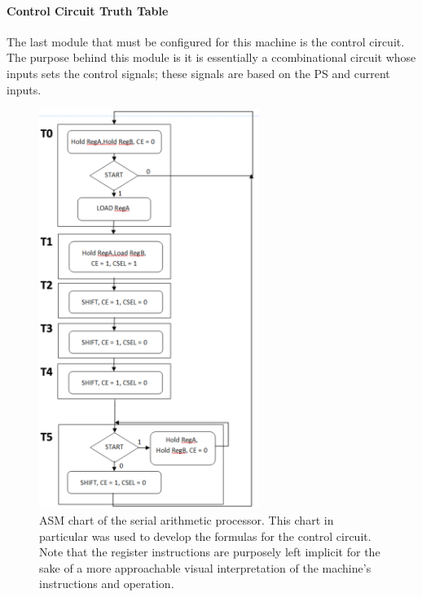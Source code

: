 \documentclass[11pt,a4paper,english]{article}
\begin{document}
   \paragraph*{Control Circuit Truth Table}
   The last module that must be configured for this machine is the control circuit. The purpose behind this module is it is essentially a ccombinational circuit whose inputs sets the control signals; these signals are based on the PS and current inputs.

   \begin{figure}[h!]
    \centering
    \includegraphics[height=130mm]{ss/ASMCHART.png}
    \caption{ASM chart of the serial arithmetic processor. This chart in particular was used to develop the formulas for the control circuit. Note that the register instructions are purposely left implicit for the sake of a more approachable visual interpretation of the machine's instructions and operation.}
    \label{figure}
   \end{figure}
    
\end{document}
